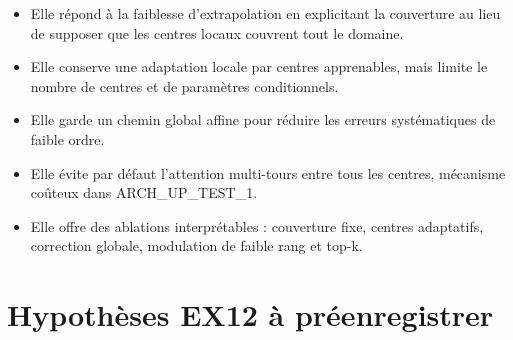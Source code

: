 \documentclass[11pt,a4paper]{article}
\begin{document}
\begin{itemize}
  \item Elle répond à la faiblesse d'extrapolation en explicitant la couverture au lieu de supposer que les centres locaux couvrent tout le domaine.
  \item Elle conserve une adaptation locale par centres apprenables, mais limite le nombre de centres et de paramètres conditionnels.
  \item Elle garde un chemin global affine pour réduire les erreurs systématiques de faible ordre.
  \item Elle évite par défaut l'attention multi-tours entre tous les centres, mécanisme coûteux dans ARCH\_UP\_TEST\_1.
  \item Elle offre des ablations interprétables : couverture fixe, centres adaptatifs, correction globale, modulation de faible rang et top-k.
\end{itemize}

\section{Hypothèses EX12 à préenregistrer}
\end{document}
